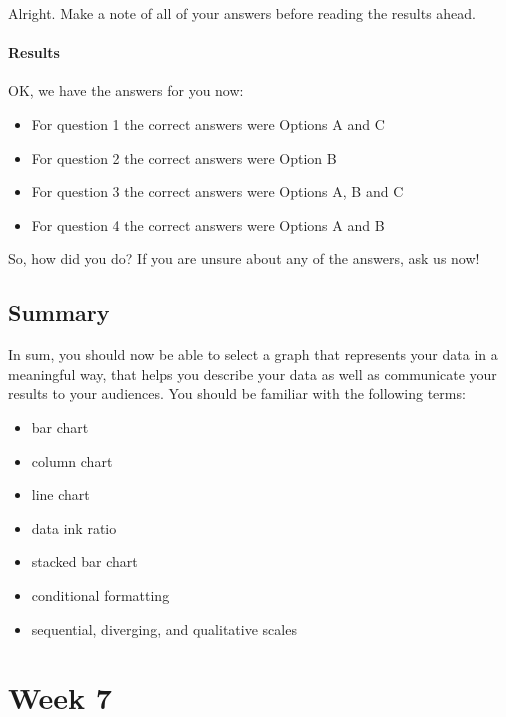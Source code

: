 \documentclass[
]{book}
\providecommand{\tightlist}{%
  \setlength{\itemsep}{0pt}\setlength{\parskip}{0pt}}
\begin{document}
Alright. Make a note of all of your answers before reading the results ahead.

\hypertarget{results}{%
\subsubsection*{Results}\label{results}}

OK, we have the answers for you now:

\begin{itemize}
\tightlist
\item
  For question 1 the correct answers were Options A and C
\item
  For question 2 the correct answers were Option B
\item
  For question 3 the correct answers were Options A, B and C
\item
  For question 4 the correct answers were Options A and B
\end{itemize}

So, how did you do? If you are unsure about any of the answers, ask us now!

\hypertarget{summary-5}{%
\section{Summary}\label{summary-5}}

In sum, you should now be able to select a graph that represents your data in a meaningful way, that helps you describe your data as well as communicate your results to your audiences. You should be familiar with the following terms:

\begin{itemize}
\tightlist
\item
  bar chart
\item
  column chart
\item
  line chart
\item
  data ink ratio
\item
  stacked bar chart
\item
  conditional formatting
\item
  sequential, diverging, and qualitative scales
\end{itemize}

\hypertarget{week7}{%
\chapter{Week 7}\label{week7}}
\end{document}
